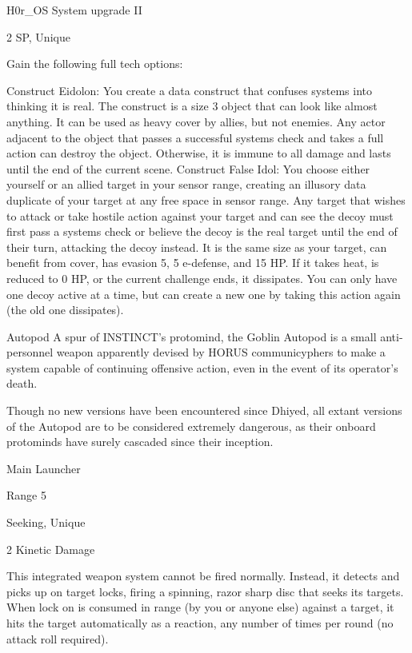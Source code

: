H0r\_OS System upgrade II

2 SP, Unique

Gain the following full tech options:

        Construct Eidolon: You create a data construct that confuses systems into thinking it is
         real. The construct is a size 3 object that can look like almost anything. It can be used as
         heavy cover by allies, but not enemies. Any actor adjacent to the object that passes a
        successful systems check and takes a full action can destroy the object. Otherwise, it is
         immune to all damage and lasts until the end of the current scene.
        Construct False Idol: You choose either yourself or an allied target in your sensor range,
        creating an illusory data duplicate of your target at any free space in sensor range. Any
        target that wishes to attack or take hostile action against your target and can see the
        decoy must first pass a systems check or believe the decoy is the real target until the end
        of their turn, attacking the decoy instead. It is the same size as your target, can benefit
        from cover, has evasion 5, 5 e-defense, and 15 HP. If it takes heat, is reduced to 0 HP, or
        the current challenge ends, it dissipates. You can only have one decoy active at a time,
         but can create a new one by taking this action again (the old one dissipates).


Autopod
A spur of INSTINCT’s protomind, the Goblin Autopod is a small anti-personnel weapon apparently
devised by HORUS communicyphers to make a system capable of continuing offensive action,
even in the event of its operator’s death.

Though no new versions have been encountered since Dhiyed, all extant versions of the Autopod
are to be considered extremely dangerous, as their onboard protominds have surely cascaded
since their inception.

Main Launcher





Range 5

Seeking, Unique

2 Kinetic Damage

This integrated weapon system cannot be fired normally. Instead, it detects and picks up on
target locks, firing a spinning, razor sharp disc that seeks its targets. When lock on is consumed
in range (by you or anyone else) against a target, it hits the target automatically as a reaction, any
number of times per round (no attack roll required).

